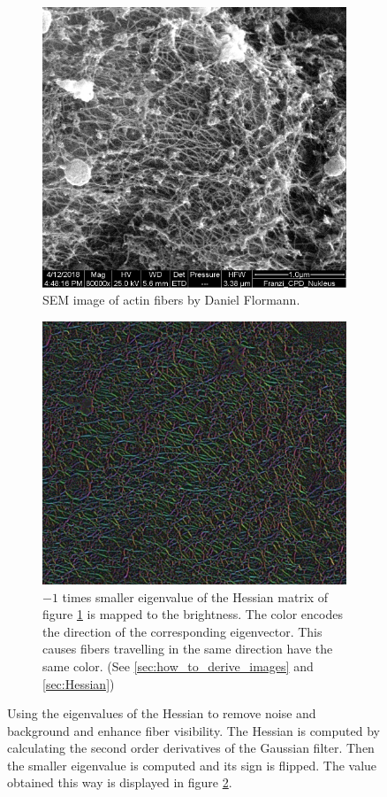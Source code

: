 \documentclass[12pt,english,twocolumn]{revtex4}
\begin{document}
\begin{figure}[h!]
    \centering
    \begin{subfigure}[b]{\linewidth}
        \includegraphics[width=.85\linewidth]{figures/og_image.png}
        \caption{SEM image of actin fibers by Daniel Flormann.}
        \label{subfig:og1}
    \end{subfigure}
    \begin{subfigure}[b]{\linewidth}
        \includegraphics[width=.85\linewidth]{figures/viz.png}
        \caption{$-1$ times smaller eigenvalue of the Hessian matrix of figure \ref{subfig:og1} is mapped to the brightness. The color encodes the direction of the corresponding eigenvector. This causes fibers travelling in the same direction have the same color. (See \ref{sec:how_to_derive_images} and \ref{sec:Hessian})}
        \label{subfig:-lambda1}
    \end{subfigure}
    \caption{Using the eigenvalues of the Hessian to remove noise and background and enhance fiber visibility. The Hessian is computed by calculating the second order derivatives of the Gaussian filter. Then the smaller eigenvalue is computed and its sign is flipped. The value obtained this way is displayed in figure \ref{subfig:-lambda1}.}
    \label{fig:-lambda1_vs_og}
\end{figure}
\end{document}
